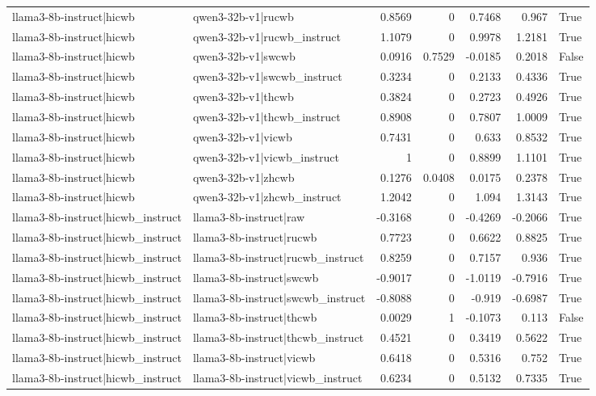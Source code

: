 \begin{table}
\begin{tabular}{l l r r r r l}
llama3-8b-instruct|hicwb & qwen3-32b-v1|rucwb & 0.8569 & 0 & 0.7468 & 0.967 & True \\
llama3-8b-instruct|hicwb & qwen3-32b-v1|rucwb_instruct & 1.1079 & 0 & 0.9978 & 1.2181 & True \\
llama3-8b-instruct|hicwb & qwen3-32b-v1|swcwb & 0.0916 & 0.7529 & -0.0185 & 0.2018 & False \\
llama3-8b-instruct|hicwb & qwen3-32b-v1|swcwb_instruct & 0.3234 & 0 & 0.2133 & 0.4336 & True \\
llama3-8b-instruct|hicwb & qwen3-32b-v1|thcwb & 0.3824 & 0 & 0.2723 & 0.4926 & True \\
llama3-8b-instruct|hicwb & qwen3-32b-v1|thcwb_instruct & 0.8908 & 0 & 0.7807 & 1.0009 & True \\
llama3-8b-instruct|hicwb & qwen3-32b-v1|vicwb & 0.7431 & 0 & 0.633 & 0.8532 & True \\
llama3-8b-instruct|hicwb & qwen3-32b-v1|vicwb_instruct & 1 & 0 & 0.8899 & 1.1101 & True \\
llama3-8b-instruct|hicwb & qwen3-32b-v1|zhcwb & 0.1276 & 0.0408 & 0.0175 & 0.2378 & True \\
llama3-8b-instruct|hicwb & qwen3-32b-v1|zhcwb_instruct & 1.2042 & 0 & 1.094 & 1.3143 & True \\
llama3-8b-instruct|hicwb_instruct & llama3-8b-instruct|raw & -0.3168 & 0 & -0.4269 & -0.2066 & True \\
llama3-8b-instruct|hicwb_instruct & llama3-8b-instruct|rucwb & 0.7723 & 0 & 0.6622 & 0.8825 & True \\
llama3-8b-instruct|hicwb_instruct & llama3-8b-instruct|rucwb_instruct & 0.8259 & 0 & 0.7157 & 0.936 & True \\
llama3-8b-instruct|hicwb_instruct & llama3-8b-instruct|swcwb & -0.9017 & 0 & -1.0119 & -0.7916 & True \\
llama3-8b-instruct|hicwb_instruct & llama3-8b-instruct|swcwb_instruct & -0.8088 & 0 & -0.919 & -0.6987 & True \\
llama3-8b-instruct|hicwb_instruct & llama3-8b-instruct|thcwb & 0.0029 & 1 & -0.1073 & 0.113 & False \\
llama3-8b-instruct|hicwb_instruct & llama3-8b-instruct|thcwb_instruct & 0.4521 & 0 & 0.3419 & 0.5622 & True \\
llama3-8b-instruct|hicwb_instruct & llama3-8b-instruct|vicwb & 0.6418 & 0 & 0.5316 & 0.752 & True \\
llama3-8b-instruct|hicwb_instruct & llama3-8b-instruct|vicwb_instruct & 0.6234 & 0 & 0.5132 & 0.7335 & True \\

\end{tabular}
\end{table}
